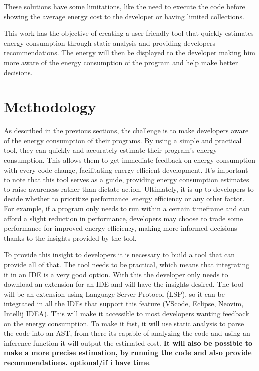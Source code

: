 \documentclass[sigplan]{acmart}
\begin{document}
These solutions have some limitations, like the need to execute the code before showing the average energy cost to the developer or having limited collections.

This work has the objective of creating a user-friendly tool that quickly estimates energy consumption through static analysis and providing developers recommendations. The energy will then be displayed to the developer making him more aware of the energy consumption of the program and help make better decisions.


% 


\section{Methodology} \label{sec:work}

As described in the previous sections, the challenge is to make developers aware of the energy consumption of their programs. By using a simple and practical tool, they can quickly and accurately estimate their program's energy consumption. This allows them to get immediate feedback on energy consumption with every code change, facilitating energy-efficient development. It's important to note that this tool serves as a guide, providing energy consumption estimates to raise awareness rather than dictate action. Ultimately, it is up to developers to decide whether to prioritize performance, energy efficiency or any other factor. For example, if a program only needs to run within a certain timeframe and can afford a slight reduction in performance, developers may choose to trade some performance for improved energy efficiency, making more informed decisions thanks to the insights provided by the tool.

To provide this insight to developers it is necessary to build a tool that can provide all of that. The tool needs to be practical, which means that integrating it in an IDE is a very good option. With this the developer only needs to download an extension for an IDE and will have the insights desired.
The tool will be an extension using Language Server Protocol (LSP), so it can be integrated in all the IDEs that support this feature (VScode, Eclipse, Neovim, Intellij IDEA). This will make it accessible to most developers wanting feedback on the energy consumption. To make it fast, it will use static analysis to parse the code into an AST, from there its capable of analyzing the code and using an inference function it will output the estimated cost. \textbf{It will also be possible to make a more precise estimation, by running the code and also provide recommendations. optional/if i have time}.
\end{document}
